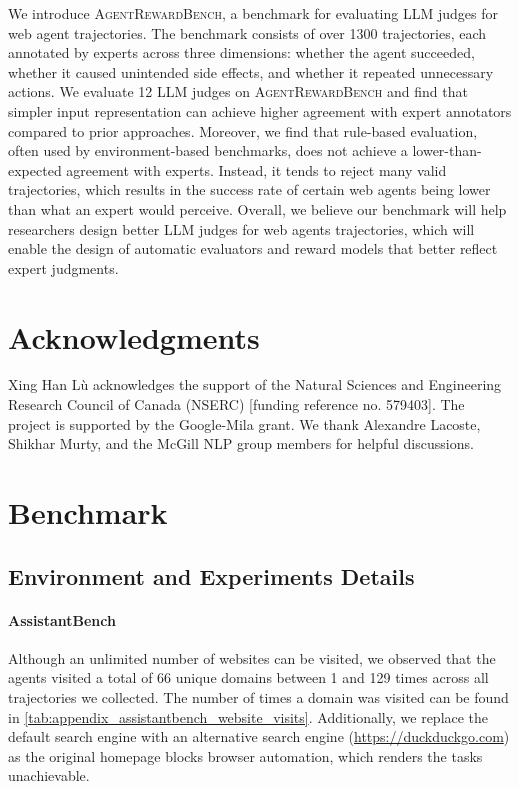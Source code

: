 \documentclass{article} %
\newcommand{\arb}{\textsc{AgentRewardBench}}
\begin{document}
We introduce \arb{}, a benchmark for evaluating LLM judges for web agent trajectories. The benchmark consists of over 1300 trajectories, each annotated by experts across three dimensions: whether the agent succeeded, whether it caused unintended side effects, and whether it repeated unnecessary actions.
We evaluate 12 LLM judges on \arb{} and find that simpler input representation can achieve higher agreement with expert annotators compared to prior approaches. Moreover, we find that rule-based evaluation, often used by environment-based benchmarks, does not achieve a lower-than-expected agreement with experts. Instead, it tends to reject many valid trajectories, which results in the success rate of certain web agents being lower than what an expert would perceive.
Overall, we believe our benchmark will help researchers design better LLM judges for web agents trajectories, which will enable the design of automatic evaluators and reward models that better reflect expert judgments.



\section*{Acknowledgments}
Xing Han Lù acknowledges the support of the Natural Sciences and Engineering Research Council of Canada (NSERC) [funding reference no. 579403]. 
The project is supported by the Google-Mila grant.
We thank Alexandre Lacoste, Shikhar Murty, and the McGill NLP group members for helpful discussions.





\newpage

\appendix
\section{Benchmark}

\subsection{Environment and Experiments Details}
\label{sec:appendix_environment_details}

\paragraph{AssistantBench} Although an unlimited number of websites can be visited, we observed that the agents visited a total of 66 unique domains between 1 and 129 times across all trajectories we collected. The number of times a domain was visited can be found in \cref{tab:appendix_assistantbench_website_visits}. Additionally, we replace the default search engine with an alternative search engine (\url{https://duckduckgo.com}) as the original homepage blocks browser automation, which renders the tasks unachievable. 
\end{document}
